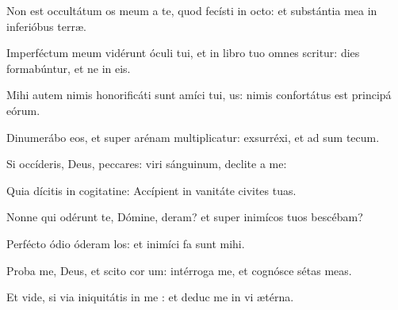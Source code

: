 \item Non est occultátum os meum a te, quod fecísti in octo:\psstar{} et substántia mea in inferióbus terræ.

\item Imperféctum meum vidérunt óculi tui,\pscross{} et in libro tuo omnes scritur:\psstar{} dies formabúntur, et ne in eis.

\item Mihi autem nimis honorificáti sunt amíci tui, us:\psstar{} nimis confortátus est principá eórum.

\item Dinumerábo eos, et super arénam multiplicatur:\psstar{} exsurréxi, et ad sum tecum.

\item Si occíderis, Deus, peccares:\psstar{} viri sánguinum, declite a me:

\item Quia dícitis in cogitatine:\psstar{} Accípient in vanitáte civites tuas.

\item Nonne qui odérunt te, Dómine, deram?\psstar{} et super inimícos tuos bescébam?

\item Perfécto ódio óderam los:\psstar{} et inimíci fa sunt mihi.

\item Proba me, Deus, et scito cor um:\psstar{} intérroga me, et cognósce sétas meas.

\item Et vide, si via iniquitátis in me :\psstar{} et deduc me in vi ætérna.

